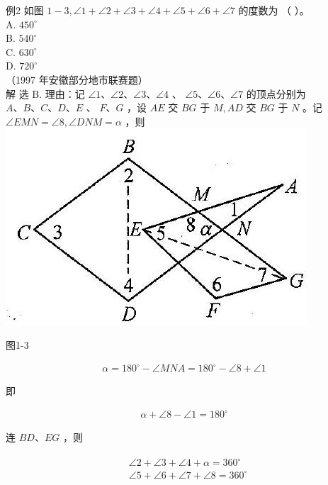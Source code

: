 \documentclass[10pt]{article}
\begin{document}
例2 如图 $1-3, \angle 1+\angle 2+\angle 3+\angle 4+\angle 5+\angle 6+\angle 7$ 的度数为 （ ）。\\
A. $450^{\circ}$\\
B. $540^{\circ}$\\
C. $630^{\circ}$\\
D. $720^{\circ}$\\
（1997 年安徽部分地市联赛题）\\
解 选 B. 理由：记 $\angle 1 、 \angle 2 、 \angle 3 、 \angle 4$ 、 $\angle 5 、 \angle 6 、 \angle 7$ 的顶点分别为 $A 、 B 、 C 、 D 、 E$ 、 $F 、 G$ ，设 $A E$ 交 $B G$ 于 $M, A D$ 交 $B G$ 于 $N$ 。记 $\angle E M N=\angle 8, \angle D N M=\alpha$ ，则\\
\includegraphics[max width=\textwidth, center]{2024_10_30_2c8f45efd4a519b08e1ag-009}

图1-3

\begin{align*}
\alpha=180^{\circ}-\angle M N A=180^{\circ}-\angle 8+\angle 1
\end{align*}

即

\begin{align*}
\alpha+\angle 8-\angle 1=180^{\circ}
\end{align*}

连 $B D 、 E G$ ，则

\begin{align*}
\begin{aligned}
& \angle 2+\angle 3+\angle 4+\alpha=360^{\circ} \\
& \angle 5+\angle 6+\angle 7+\angle 8=360^{\circ}
\end{aligned}
\end{align*}
\end{document}
